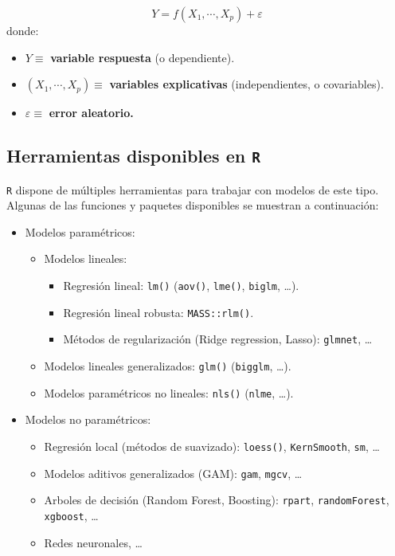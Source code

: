 \documentclass[]{book}
\begin{document}
\[Y=f(X_{1},\cdots,X_{p})+\varepsilon\] donde:

\begin{itemize}
\item
  \(Y\equiv\) \textbf{variable respuesta} (o dependiente).
\item
  \(\left( X_{1},\cdots,X_{p}\right) \equiv\) \textbf{variables
  explicativas} (independientes, o covariables).
\item
  \(\varepsilon\equiv\) \textbf{error aleatorio.}
\end{itemize}

\subsection{\texorpdfstring{Herramientas disponibles en
\texttt{R}}{Herramientas disponibles en R}}\label{herramientas-disponibles-en-r}

\texttt{R} dispone de múltiples herramientas para trabajar con modelos
de este tipo. Algunas de las funciones y paquetes disponibles se
muestran a continuación:

\begin{itemize}
\item
  Modelos paramétricos:

  \begin{itemize}
  \item
    Modelos lineales:

    \begin{itemize}
    \item
      Regresión lineal: \texttt{lm()} (\texttt{aov()}, \texttt{lme()},
      \texttt{biglm}, \ldots{}).
    \item
      Regresión lineal robusta: \texttt{MASS::rlm()}.
    \item
      Métodos de regularización (Ridge regression, Lasso):
      \texttt{glmnet}, \ldots{}
    \end{itemize}
  \item
    Modelos lineales generalizados: \texttt{glm()} (\texttt{bigglm},
    \ldots{}).
  \item
    Modelos paramétricos no lineales: \texttt{nls()} (\texttt{nlme},
    \ldots{}).
  \end{itemize}
\item
  Modelos no paramétricos:

  \begin{itemize}
  \item
    Regresión local (métodos de suavizado): \texttt{loess()},
    \texttt{KernSmooth}, \texttt{sm}, \ldots{}
  \item
    Modelos aditivos generalizados (GAM): \texttt{gam}, \texttt{mgcv},
    \ldots{}
  \item
    Arboles de decisión (Random Forest, Boosting): \texttt{rpart},
    \texttt{randomForest}, \texttt{xgboost}, \ldots{}
  \item
    Redes neuronales, \ldots{}
  \end{itemize}
\end{itemize}
\end{document}
